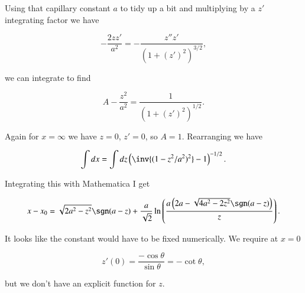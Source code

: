 \begin{Answer}[ref={problem:fluids:review:q3}]
Using that capillary constant $a$ to tidy up a bit and multiplying by a $z'$ integrating factor we have

\begin{equation}\label{eqn:continuumFluidsReview:1750}
-\frac{2 z z'}{a^2} = -\frac{z'' z'}{(1 + (z')^2)^{3/2}},
\end{equation}

we can integrate to find

\begin{equation}\label{eqn:continuumFluidsReview:1770}
A - \frac{z^2}{a^2} = \frac{1}{(1 + (z')^2)^{1/2}}.
\end{equation}

Again for $x = \infty$ we have $z = 0$, $z' = 0$, so $A = 1$.  Rearranging we have

\begin{equation}\label{eqn:continuumFluidsReview:1790}
\int dx = \int dz \left( \inv{(1 - z^2/a^2)^2} - 1 \right)^{-1/2}.
\end{equation}

Integrating this with Mathematica I get

\begin{equation}\label{eqn:continuumFluidsReview:1810}
x - x_0 =
\sqrt{2 a^2-z^2} \sgn(a-z)+ \frac{a}{\sqrt{2}} \ln \left(\frac{a \left(2 a-\sqrt{4 a^2-2 z^2} \sgn(a-z)\right)}{z}\right).
\end{equation}

It looks like the constant would have to be fixed numerically.  We require at $x = 0$

\begin{equation}\label{eqn:continuumFluidsReview:1830}
z'(0) = \frac{-\cos\theta}{\sin\theta} = -\cot \theta,
\end{equation}

but we don't have an explicit function for $z$.
\end{Answer}
